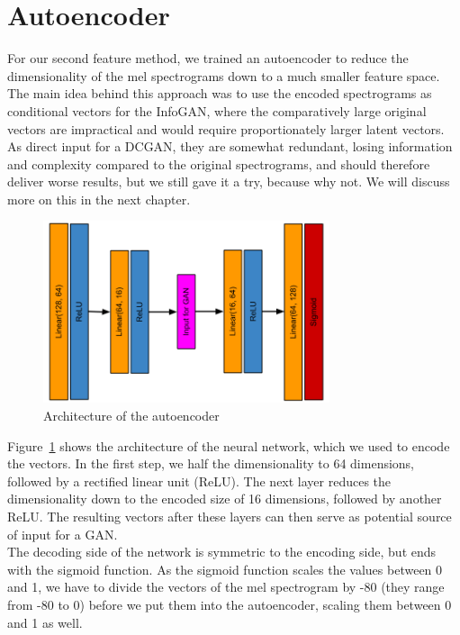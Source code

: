 \section{Autoencoder}
    For our second feature method, we trained an autoencoder to reduce the dimensionality of the mel spectrograms down to a much smaller feature space.
    The main idea behind this approach was to use the encoded spectrograms as conditional vectors for the InfoGAN, where the comparatively large original vectors are impractical and would require proportionately larger latent vectors.
    As direct input for a DCGAN, they are somewhat redundant, losing information and complexity compared to the original spectrograms, and should therefore deliver worse results, but we still gave it a try, because why not.
    We will discuss more on this in the next chapter.\\
    \begin{figure}[!t]
        \centering
        \includegraphics[width=0.75\textwidth]{images/autoencoder}    
        \caption{Architecture of the autoencoder}
        \label{autoencoder}
    \end{figure}
    \indent Figure~\ref{autoencoder} shows the architecture of the neural network, which we used to encode the vectors. In the first step, we half the dimensionality to 64 dimensions, followed by a rectified linear unit (ReLU).
    The next layer reduces the dimensionality down to the encoded size of 16 dimensions, followed by another ReLU. 
    The resulting vectors after these layers can then serve as potential source of input for a GAN.\\
    \indent The decoding side of the network is symmetric to the encoding side, but ends with the sigmoid function. 
    As the sigmoid function scales the values between 0 and 1, we have to divide the vectors of the mel spectrogram by -80 (they range from -80 to 0) before we put them into the autoencoder, scaling them between 0 and 1 as well. 
